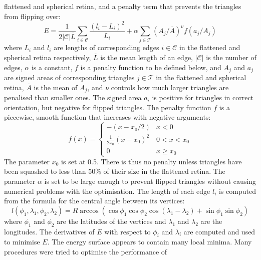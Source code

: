 \documentclass[10pt]{article}
\begin{document}
\begin{enumerate}
  flattened and spherical retina, and a penalty term that prevents the
  triangles from flipping over:
  \begin{equation}
    E = \frac{1}{2|\mathcal{C}|\overline{L}} \sum_{i\in\mathcal{C}} \frac{(l_i - L_i)^2}{L_i}  
    + \alpha\sum_{j\in\mathcal{T}} (A_j/\overline{A})^\nu f(a_j/A_j)
  \end{equation}
  where $L_i$ and $l_i$ are lengths of corresponding edges
  $i\in\mathcal{C}$ in the flattened and spherical retina
  respectively, $\overline{L}$ is the mean length of an edge,
  $|\mathcal{C}|$ is the number of edges, $\alpha$ is a constant, $f$
  is a penalty function to be defined below, and $A_j$ and $a_j$ are
  signed areas of corresponding triangles $j\in\mathcal{T}$ in the
  flattened and spherical retina, $\overline{A}$ is the mean of $A_j$,
  and $\nu$ controls how much larger triangles are penalised than
  smaller ones.  The signed area $a_i$ is positive for triangles in
  correct orientation, but negative for flipped triangles. The penalty
  function $f$ is a piecewise, smooth function that increases with
  negative arguments:
  \begin{equation}
    \label{retistruct_plos:eq:1}
    f(x) = \left\{
        \begin{array}{ll}
          -(x - x_0/2) & x < 0 \\
          \frac{1}{2x_0}(x - x_0)^2 & 0 < x <x_0 \\
          0 & x \ge x_0
          \end{array} \right.
  \end{equation}
  The parameter $x_0$ is set at 0.5. There is thus no penalty unless
  triangles have been squashed to less than 50\% of their size in the
  flattened retina.  The parameter $\alpha$ is set to be large enough
  to prevent flipped triangles without causing numerical problems with
  the optimisation. The length of each edge $l_i$ is computed from the
  formula for the central angle between its vertices:
  \begin{equation}
    \label{retistruct_plos:eq:2}
    l(\phi_1, \lambda_1, \phi_2, \lambda_2) =
    R\arccos(\cos\phi_1\cos\phi_2\cos(\lambda_1-\lambda_2) +
    \sin\phi_1\sin\phi_2)
  \end{equation}
  where $\phi_1$ and $\phi_2$ are the latitudes of the vertices and
  $\lambda_1$ and $\lambda_2$ are the longitudes.  The derivatives of
  $E$ with respect to $\phi_i$ and $\lambda_i$ are computed and used
  to minimise $E$. The energy surface appears to contain many local
  minima. Many procedures were tried to optimise the performance of

\end{enumerate}
\end{document}

